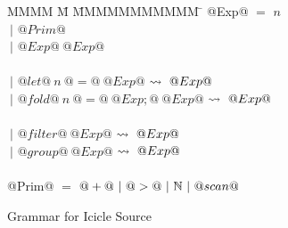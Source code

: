 
\begin{figure}

\begin{tabbing}
MMMM \= M \= MMMMMMMMMMM \= \kill
@Exp@
    \> $=$  \> $n$ \\
    \> $~|$ \> $@Prim@$ \\
    \> $~|$ \> $@Exp@~@Exp@$ \\
\\
    \> $~|$ \> $@let@~n~@=@~@Exp@$
            \> $\leadsto~@Exp@$ \\
    \> $~|$ \> $@fold@~n~@=@~@Exp;@~@Exp@$
            \> $\leadsto~@Exp@$ \\
\\
    \> $~|$ \> $@filter@~@Exp@$
            \> $\leadsto~@Exp@$ \\
    \> $~|$ \> $@group@~@Exp@$
            \> $\leadsto~@Exp@$ \\
\\
@Prim@
    \> $=$  \> $@+@~|~@>@~|~\mathbb{N}~|~@scan@$ \\
\end{tabbing}


\caption{Grammar for Icicle Source}
\label{fig:source:grammar}
\end{figure}


